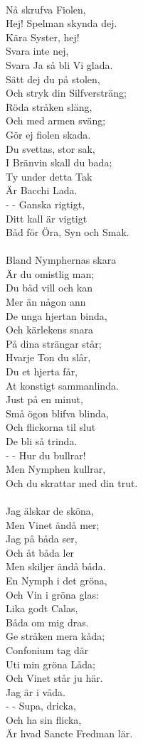 \\
Nå skrufva Fiolen,\\
Hej! Spelman skynda dej.\\
Kära Syster, hej!\\
Svara inte nej,\\
Svara Ja så bli Vi glada.\\
Sätt dej du på stolen,\\
Och stryk din Silfversträng;\\
Röda stråken släng,\\
Och med armen sväng;\\
Gör ej fiolen skada.\\
Du svettas, stor sak,\\
I Bränvin skall du bada;\\
Ty under detta Tak\\
Är Bacchi Lada.\\
-  -  Ganska rigtigt,\\
Ditt kall är vigtigt\\
Båd för Öra, Syn och Smak.\\
\\
Bland Nymphernas skara\\
Är du omistlig man;\\
Du båd vill och kan\\
Mer än någon ann\\
De unga hjertan binda,\\
Och kärlekens snara\\
På dina strängar står;\\
Hvarje Ton du slår,\\
Du et hjerta får,\\
At konstigt sammanlinda.\\
Just på en minut,\\
Små ögon blifva blinda,\\
Och flickorna til slut\\
De bli så trinda.\\
-  -  Hur du bullrar!\\
Men Nymphen kullrar,\\
Och du skrattar med din trut.\\
\\
Jag älskar de sköna,\\
Men Vinet ändå mer;\\
Jag på båda ser,\\
Och åt båda ler\\
Men skiljer ändå båda.\\
En Nymph i det gröna,\\
Och Vin i gröna glas:\\
Lika godt Calas,\\
Båda om mig dras.\\
Ge stråken mera kåda;\\
Confonium tag där\\
Uti min gröna Låda;\\
Och Vinet står ju här.\\
Jag är i våda.\\
-  -  Supa, dricka,\\
Och ha sin flicka,\\
Är hvad Sancte Fredman lär.
